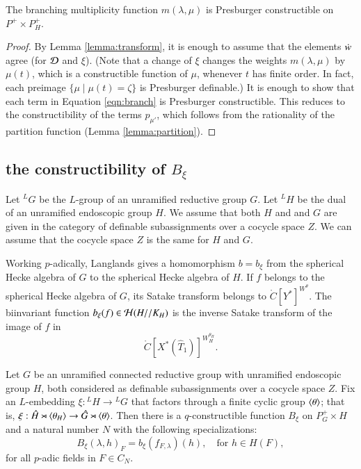 \begin{lemma}\label{lemma:branch} 
  The branching multiplicity function $m(\lambda,\mu)$ is Presburger
  constructible on $P^+\times P_H^+$.
\end{lemma}

\begin{proof} 
  By Lemma \ref{lemma:transform}, it is enough to assume that the
  elements $\dot w$ agree (for $\mathcal D$ and $\xi$).  (Note that a change of
  $\xi$ changes the weights $m(\lambda,\mu)$ by $\mu(t)$, which is a
  constructible function of $\mu$, whenever $t$ has finite order.  In
  fact, each preimage $\{\mu\mid \mu(t) =\zeta\}$ is Presburger
  definable.)  It is enough to show that each term in Equation
  \ref{eqn:branch} is Presburger constructible.  This reduces to the
  constructibility of the terms $p_{\mu'}$, which follows from the
  rationality of the partition function (Lemma \ref{lemma:partition}).
\end{proof}


\subsection{the constructibility of $B_\xi$}\label{sec:B}

Let ${}^LG$ be the $L$-group of an unramified reductive group
$G$.  Let ${}^LH$ be the dual of an unramified endoscopic group $H$.
We assume that both $H$ and and $G$ are given in the category of
definable subassignments over a cocycle space $Z$.  We can assume that
the cocycle space $Z$ is the same for $H$ and $G$.



Working $p$-adically, Langlands gives a homomorphism
$b = b_\xi$ from the spherical Hecke algebra of $G$ to the spherical
Hecke algebra of $H$.  If $f$ belongs to the spherical Hecke algebra
of $G$, its Satake transform belongs to $\ring{C}[Y^*]^{W^\theta}$.
The biinvariant function $b_\xi(f)\in\mathcal H(H//K_H)$ is the inverse
Satake transform of the image of $f$ in
\[
\ring{C}[X^*(\hat T_1)]^{W_H^{\theta_H}}.
\]

\begin{theorem}\label{thm:B}
  Let $G$ be an unramified connected reductive group with unramified
  endoscopic group $H$, both considered as definable subassignments
  over a cocycle space $Z$.  Fix an $L$-embedding $\xi:{}^LH\to {}^LG$
  that factors through a finite cyclic group $\langle{\theta}\rangle$; that is,
  $\xi:\hat H\rtimes \langle{\theta_H}\rangle \to \hat G \rtimes \langle{\theta}\rangle$.
  Then there is a $q$-constructible function $B_\xi$ on $P^+_G\times H$
  and a natural number $N$ with the following specializations:
\[
B_\xi(\lambda,h)_F = b_\xi(f_{F,\lambda})(h),\quad \text{for } h\in H(F),
\]
for all $p$-adic fields in $F\in C_N$.  
\end{theorem}

